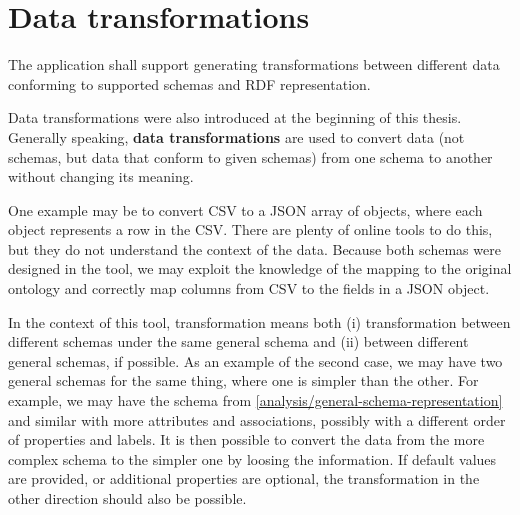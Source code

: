 \section{Data transformations}

\begin{requirement}
    The application shall support generating transformations between different data conforming to supported schemas and RDF representation.
\end{requirement}

Data transformations were also introduced at the beginning of this thesis. Generally speaking, \textbf{data transformations} are used to convert data (not schemas, but data that conform to given schemas) from one schema to another without changing its meaning.

One example may be to convert CSV to a JSON array of objects, where each object represents a row in the CSV. There are plenty of online tools to do this, but they do not understand the context of the data. Because both schemas were designed in the tool, we may exploit the knowledge of the mapping to the original ontology and correctly map columns from CSV to the fields in a JSON object.

In the context of this tool, transformation means both (i) transformation between different schemas under the same general schema and (ii) between different general schemas, if possible. As an example of the second case, we may have two general schemas for the same thing, where one is simpler than the other. For example, we may have the schema from \autoref{analysis/general-schema-representation} and similar with more attributes and associations, possibly with a different order of properties and labels. It is then possible to convert the data from the more complex schema to the simpler one by loosing the information. If default values are provided, or additional properties are optional, the transformation in the other direction should also be possible.

\medskip

